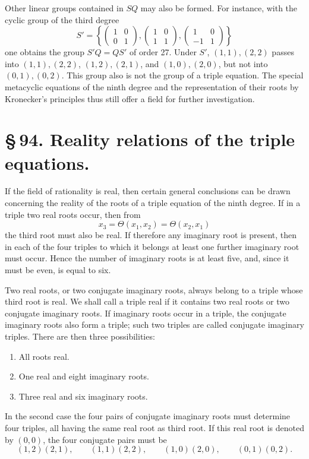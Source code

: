\documentclass[11pt]{article}
\providecommand{\mat}[4]{\begin{pmatrix}#1&#2\\#3&#4\end{pmatrix}}
\providecommand{\mat}[4]{\begin{pmatrix}#1&#2\\#3&#4\end{pmatrix}}
\providecommand{\mat}[1]{\begin{pmatrix}#1\end{pmatrix}}
\begin{document}
Other linear groups contained in \(SQ\) may also be formed. For instance, with the cyclic group of the third degree
\[
 S'=\left\{
 \mat{1}{0}{0}{1},
 \mat{1}{0}{1}{1},
 \mat{1}{0}{-1}{1}
 \right\}
\]
one obtains the group \(S'Q=QS'\) of order 27. Under \(S'\), \((1,1),(2,2)\) passes into \((1,1),(2,2)\), \((1,2),(2,1)\), and \((1,0),(2,0)\), but not into \((0,1),(0,2)\). This group also is not the group of a triple equation. The special metacyclic equations of the ninth degree and the representation of their roots by Kronecker's principles thus still offer a field for further investigation.

\section*{\S\,94. Reality relations of the triple equations.}

If the field of rationality is real, then certain general conclusions can be drawn concerning the reality of the roots of a triple equation of the ninth degree. If in a triple two real roots occur, then from
\[
 x_3=\Theta(x_1,x_2)=\Theta(x_2,x_1)
\]
the third root must also be real. If therefore any imaginary root is present, then in each of the four triples to which it belongs at least one further imaginary root must occur. Hence the number of imaginary roots is at least five, and, since it must be even, is equal to six.

Two real roots, or two conjugate imaginary roots, always belong to a triple whose third root is real. We shall call a triple real if it contains two real roots or two conjugate imaginary roots. If imaginary roots occur in a triple, the conjugate imaginary roots also form a triple; such two triples are called conjugate imaginary triples. There are then three possibilities:
\begin{enumerate}[label=\arabic*.]
\item All roots real.
\item One real and eight imaginary roots.
\item Three real and six imaginary roots.
\end{enumerate}

In the second case the four pairs of conjugate imaginary roots must determine four triples, all having the same real root as third root. If this real root is denoted by \((0,0)\), the four conjugate pairs must be
\[
(1,2)(2,1),\qquad (1,1)(2,2),\qquad (1,0)(2,0),\qquad (0,1)(0,2).
\]
\end{document}
